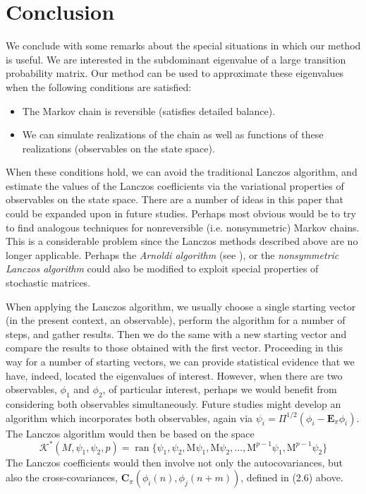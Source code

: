 \documentclass[12pt,letterpaper]{report}
\theoremstyle{plain}
\theoremstyle{definition}
\theoremstyle{remark}
\numberwithin{theorem}{chapter}
\numberwithin{claim}{chapter}
\numberwithin{equation}{chapter}
\numberwithin{conjecture}{chapter}
\newcommand\sK{\ensuremath{\mathcal{K}}}
\newcommand\bC{\ensuremath{\mathbf{C}}}
\newcommand\M{\ensuremath{\mathrm{M}}}
\newcommand\bE{\ensuremath{\mathbf{E}}}
\newcommand\ran{\ensuremath{\operatorname{ran}}}
\newcommand\<{\ensuremath{\langle}}
\renewcommand\>{\ensuremath{\rangle}}
\begin{document}
\chapter{Conclusion}
\label{cha:conclusion}
We conclude with some remarks about the special situations in which our
method is useful.
We are interested in the subdominant eigenvalue of a large transition probability matrix. Our
method can be used to approximate these eigenvalues when the following conditions are satisfied:
\begin{itemize}
\item 
The Markov chain is reversible (satisfies detailed balance).
\item
We can simulate realizations of the chain as well as functions of these
realizations (observables on the state space).
\end{itemize}
When these conditions hold, we can avoid the traditional Lanczos algorithm, and
estimate the values of the Lanczos coeﬂicients via the variational properties of
observables on the state space. 
There are a number of ideas in this paper that could be expanded upon in future
studies.  Perhaps most obvious would be to try to find analogous techniques for
nonreversible (i.e. nonsymmetric) Markov chains. This is a considerable problem
since the Lanczos methods described above are no longer applicable. Perhaps the
\emph{Arnoldi algorithm} (see \cite[Algorithm 6.9]{Demmel:1997}), or the
\emph{nonsymmetric Lanczos algorithm} could also be modified to exploit
special properties of stochastic matrices. %
%
%
%
%

When applying the Lanczos algorithm, we usually choose a single starting vector (in the
present context, an observable), perform the algorithm for a number of steps, and gather results.
Then we do the same with a new starting vector and compare the results to those obtained with
the first vector. Proceeding in this way for a number of starting vectors, we can provide statistical
evidence that we have, indeed, located the eigenvalues of interest. However, when there are two
observables, $\phi_1$ and $\phi_2$, of particular interest, perhaps we would
benefit from considering both observables simultaneously. Future studies might
develop an algorithm which incorporates both observables, 
again via $\psi_i = \Pi^{1/2}(\phi_i - \bE_{\pi}\phi_i)$. %
The Lanczos algorithm would then be based on the space 
\[
\sK^*(M,\psi_1, \psi_2, p) =  \ran\{\psi_1, \psi_2, \M\psi_1, 
\M\psi_2, \dots, \M^{p-1}\psi_1, \M^{p-1}\psi_2\}
\]
The Lanczos coefficients would then involve not only the autocovariances,
but also the cross-covariances, 
$\bC_\pi(\phi_i(n), \phi_j(n+m))$, defined in (2.6) above.
\end{document}
